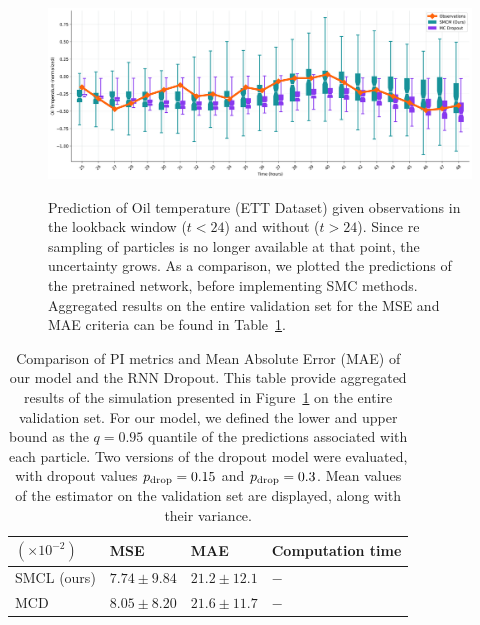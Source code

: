 \documentclass[journal]{IEEEtran}
\begin{document}
\begin{figure}[htpb]
	\centering
	\caption{Prediction of Oil temperature (ETT Dataset) given observations in the lookback window ($t<24$) and without ($t>24$).
		Since re sampling of particles is no longer available at that point, the uncertainty grows.
		As a comparison, we plotted the predictions of the pretrained network, before implementing SMC methods.
		Aggregated results on the entire validation set for the MSE and MAE criteria can be found in Table~\ref{tab:ci_comparison}.}
	\includegraphics[width=\linewidth]{filter_kp24_ett.png}
	\label{fig:filter_k+24}
\end{figure}

\begin{table}[htpb]
	\centering
	\caption{Comparison of PI metrics and Mean Absolute Error (MAE) of our model and the RNN Dropout. This table provide aggregated results of the simulation presented in Figure~\ref{fig:filter_k+24} on the entire validation set. For our model, we defined the lower and upper bound as the $q=0.95$ quantile of the predictions associated with each particle. Two versions of the dropout model were evaluated, with dropout values $p_\textnormal{drop}=0.15$ and $p_\textnormal{drop}=0.3$. Mean values of the estimator on the validation set are displayed, along with their variance.}
	\label{tab:ci_comparison}
	\begin{tabular}{llll}
		\toprule
		$(\times 10^{-2})$ & MSE             & MAE             & Computation time \\
		\toprule
		SMCL (ours)        & $7.74 \pm 9.84$ & $21.2 \pm 12.1$ & $-$              \\
		MCD                & $8.05 \pm 8.20$ & $21.6 \pm 11.7$ & $-$              \\
		\bottomrule
	\end{tabular}
\end{table}
\end{document}
